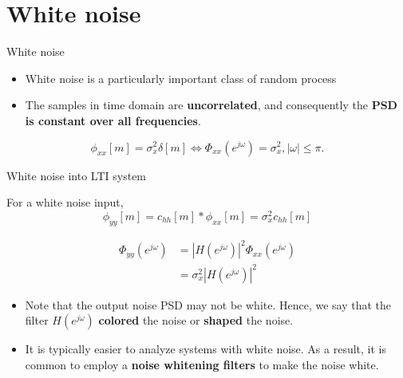 \documentclass[10pt, handout]{beamer}
\begin{document}
\section{White noise}
\begin{frame}{White noise}

\begin{itemize}
	\item White noise is a particularly important class of random process
	\item The samples in time domain are \textbf{uncorrelated}, and consequently the \textbf{PSD is constant over all frequencies}.
\end{itemize}

\begin{equation*}
\phi_{xx}[m] = \sigma_x^2\delta[m] \Longleftrightarrow \Phi_{xx}(e^{j\omega}) = \sigma_x^2, |\omega|\leq\pi.
\end{equation*}

\begin{center}
	\resizebox{0.7\linewidth}{!}{}
\end{center}

\end{frame}

\begin{frame}{White noise into LTI system}

For a white noise input, 
\begin{equation*} \tag{output autocorrelation function}
\phi_{yy}[m] = c_{hh}[m]\ast \phi_{xx}[m] = \sigma_x^2c_{hh}[m]
\end{equation*}

\begin{align*} 
\Phi_{yy}(e^{j\omega}) &= |H(e^{j\omega})|^2\Phi_{xx}(e^{j\omega}) \\
&= \sigma_x^2|H(e^{j\omega})|^2 \tag{output PSD}
\end{align*}

\begin{itemize}
	\item Note that the output noise PSD may not be white. Hence, we say that the filter $H(e^{j\omega})$ \textbf{colored} the noise or \textbf{shaped} the noise.
	\item It is typically easier to analyze systems with white noise. As a result, it is common to employ a \textbf{noise whitening filters} to make the noise white. 
\end{itemize}


\end{frame}
\end{document}
